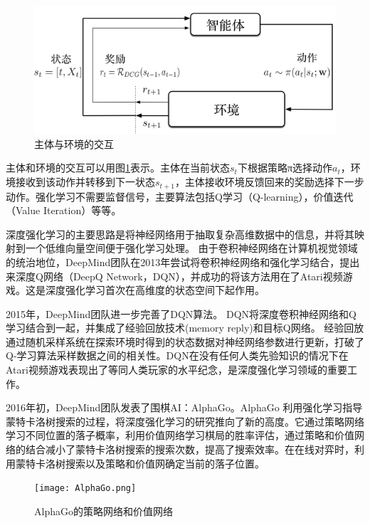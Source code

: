 \begin{figure}[!htbp]
\vspace{1em}
\centering
  \includegraphics[width=0.8\linewidth]{figures/interaction.png}
  \caption{主体与环境的交互}
  \label{fig:interaction}       %
\vspace{1em}
\end{figure}

主体和环境的交互可以用图\ref{fig:interaction}表示。主体在当前状态$s_t$下根据策略π选择动作$a_t$，环境接收到该动作并转移到下一状态$s_{t+1}$，主体接收环境反馈回来的奖励选择下一步动作。强化学习不需要监督信号，主要算法包括Q学习（Q-learning），价值迭代（Value Iteration）等等。

深度强化学习的主要思路是将神经网络用于抽取复杂高维数据中的信息，并将其映射到一个低维向量空间便于强化学习处理。
由于卷积神经网络在计算机视觉领域的统治地位，DeepMind团队在2013年尝试将卷积神经网络和强化学习结合，提出来深度Q网络（DeepQ Network，DQN）\cite{Mnih2013PlayingAW}，并成功的将该方法用在了Atari视频游戏。这是深度强化学习首次在高维度的状态空间下起作用。

2015年，DeepMind团队进一步完善了DQN算法\cite{Mnih2015HumanlevelCT}。
DQN将深度卷积神经网络和Q学习结合到一起，并集成了经验回放技术(memory reply)和目标Q网络。
经验回放通过随机采样系统在探索环境时得到的状态数据对神经网络参数进行更新，打破了Q-学习算法采样数据之间的相关性。DQN在没有任何人类先验知识的情况下在Atari视频游戏表现出了等同人类玩家的水平纪念，是深度强化学习领域的重要工作。

2016年初，DeepMind团队发表了围棋AI：AlphaGo\cite{Silver2016MasteringTG}。AlphaGo 利用强化学习指导蒙特卡洛树搜索的过程，将深度强化学习的研究推向了新的高度。它通过策略网络学习不同位置的落子概率，利用价值网络学习棋局的胜率评估，通过策略和价值网络的结合减小了蒙特卡洛树搜索的搜索次数，提高了搜索效率。在在线对弈时，利用蒙特卡洛树搜索以及策略和价值网确定当前的落子位置。

\begin{figure}[!htbp]\centering
\vspace{1em}
  \texttt{[image: AlphaGo.png]}
  \caption{AlphaGo的策略网络和价值网络}  \label{fig:AlphaGo}       %
\vspace{1em}
\end{figure}

